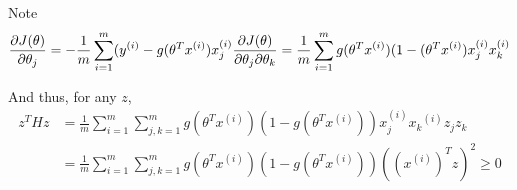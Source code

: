 \begin{answer}
    Note
    $$
    \frac{\partial J(\theta)}{\partial \theta_j} = -\frac{1}{m}\sum_{i=1}^m (y^{(i)} - g(\theta^Tx^{(i)})x^{(i)}_j\\
\frac{\partial J(\theta)}{\partial \theta_j\partial \theta_k} = \frac{1}{m}\sum_{i=1}^m g(\theta^Tx^{(i)})(1- (\theta^Tx^{(i)})x^{(i)}_jx^{(i)}_k\\
$$

And thus, for any $z$, 
$$
    \begin{aligned}
z^THz &= \frac{1}{m}\sum_{i=1}^m \sum_{j, k=1}^mg(\theta^Tx^{(i)})(1 - g(\theta^Tx^{(i)}))x_j^{(i)}x_k{^{(i)}} z_j z_k\\
        &= \frac{1}{m}\sum_{i=1}^m \sum_{j, k=1}^mg(\theta^Tx^{(i)})(1 - g(\theta^Tx^{(i)}))((x^{(i)})^Tz)^2 \ge 0
    \end{aligned}
$$
\end{answer}
